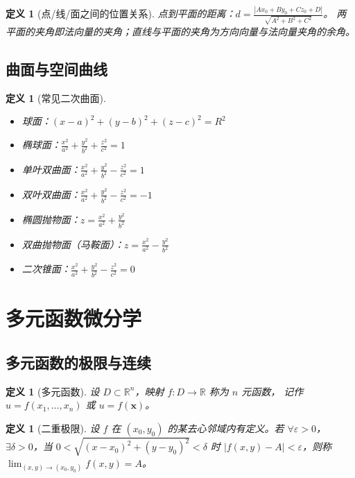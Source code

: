 \documentclass[12pt,a4paper]{ctexart}
\newtheorem{definition}[theorem]{定义}
\theoremstyle{remark}
\begin{document}
\begin{definition}[点/线/面之间的位置关系]
点到平面的距离：$d = \frac{|Ax_0+By_0+Cz_0+D|}{\sqrt{A^2+B^2+C^2}}$。
两平面的夹角即法向量的夹角；直线与平面的夹角为方向向量与法向量夹角的余角。
\end{definition}

\subsection{曲面与空间曲线}

\begin{definition}[常见二次曲面]
\begin{itemize}
  \item 球面：$(x-a)^2+(y-b)^2+(z-c)^2=R^2$
  \item 椭球面：$\frac{x^2}{a^2}+\frac{y^2}{b^2}+\frac{z^2}{c^2}=1$
  \item 单叶双曲面：$\frac{x^2}{a^2}+\frac{y^2}{b^2}-\frac{z^2}{c^2}=1$
  \item 双叶双曲面：$\frac{x^2}{a^2}+\frac{y^2}{b^2}-\frac{z^2}{c^2}=-1$
  \item 椭圆抛物面：$z = \frac{x^2}{a^2}+\frac{y^2}{b^2}$
  \item 双曲抛物面（马鞍面）：$z = \frac{x^2}{a^2}-\frac{y^2}{b^2}$
  \item 二次锥面：$\frac{x^2}{a^2}+\frac{y^2}{b^2}-\frac{z^2}{c^2}=0$
\end{itemize}
\end{definition}

\section{多元函数微分学}

\subsection{多元函数的极限与连续}

\begin{definition}[多元函数]
设 $D \subset \mathbb{R}^n$，映射 $f: D \to \mathbb{R}$ 称为 $n$ 元函数，
记作 $u = f(x_1,\dots,x_n)$ 或 $u = f(\mathbf{x})$。
\end{definition}

\begin{definition}[二重极限]
设 $f$ 在 $(x_0,y_0)$ 的某去心邻域内有定义。若 $\forall \varepsilon > 0$，
$\exists \delta > 0$，当 $0 < \sqrt{(x-x_0)^2+(y-y_0)^2} < \delta$ 时
$|f(x,y)-A|<\varepsilon$，则称 $\lim_{(x,y)\to(x_0,y_0)} f(x,y) = A$。
\end{definition}
\end{document}
